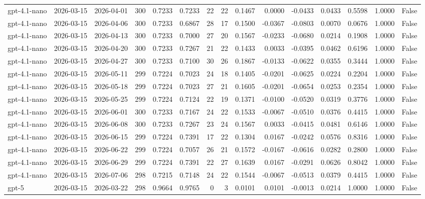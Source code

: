 \begin{table}
\begin{tabular}{lllrrrrrrrrrrrr}
gpt-4.1-nano & 2026-03-15 & 2026-04-01 & 300 & 0.7233 & 0.7233 & 22 & 22 & 0.1467 & 0.0000 & -0.0433 & 0.0433 & 0.5598 & 1.0000 & False \\
gpt-4.1-nano & 2026-03-15 & 2026-04-06 & 300 & 0.7233 & 0.6867 & 28 & 17 & 0.1500 & -0.0367 & -0.0803 & 0.0070 & 0.0676 & 1.0000 & False \\
gpt-4.1-nano & 2026-03-15 & 2026-04-13 & 300 & 0.7233 & 0.7000 & 27 & 20 & 0.1567 & -0.0233 & -0.0680 & 0.0214 & 0.1908 & 1.0000 & False \\
gpt-4.1-nano & 2026-03-15 & 2026-04-20 & 300 & 0.7233 & 0.7267 & 21 & 22 & 0.1433 & 0.0033 & -0.0395 & 0.0462 & 0.6196 & 1.0000 & False \\
gpt-4.1-nano & 2026-03-15 & 2026-04-27 & 300 & 0.7233 & 0.7100 & 30 & 26 & 0.1867 & -0.0133 & -0.0622 & 0.0355 & 0.3444 & 1.0000 & False \\
gpt-4.1-nano & 2026-03-15 & 2026-05-11 & 299 & 0.7224 & 0.7023 & 24 & 18 & 0.1405 & -0.0201 & -0.0625 & 0.0224 & 0.2204 & 1.0000 & False \\
gpt-4.1-nano & 2026-03-15 & 2026-05-18 & 299 & 0.7224 & 0.7023 & 27 & 21 & 0.1605 & -0.0201 & -0.0654 & 0.0253 & 0.2354 & 1.0000 & False \\
gpt-4.1-nano & 2026-03-15 & 2026-05-25 & 299 & 0.7224 & 0.7124 & 22 & 19 & 0.1371 & -0.0100 & -0.0520 & 0.0319 & 0.3776 & 1.0000 & False \\
gpt-4.1-nano & 2026-03-15 & 2026-06-01 & 300 & 0.7233 & 0.7167 & 24 & 22 & 0.1533 & -0.0067 & -0.0510 & 0.0376 & 0.4415 & 1.0000 & False \\
gpt-4.1-nano & 2026-03-15 & 2026-06-08 & 300 & 0.7233 & 0.7267 & 23 & 24 & 0.1567 & 0.0033 & -0.0415 & 0.0481 & 0.6146 & 1.0000 & False \\
gpt-4.1-nano & 2026-03-15 & 2026-06-15 & 299 & 0.7224 & 0.7391 & 17 & 22 & 0.1304 & 0.0167 & -0.0242 & 0.0576 & 0.8316 & 1.0000 & False \\
gpt-4.1-nano & 2026-03-15 & 2026-06-22 & 299 & 0.7224 & 0.7057 & 26 & 21 & 0.1572 & -0.0167 & -0.0616 & 0.0282 & 0.2800 & 1.0000 & False \\
gpt-4.1-nano & 2026-03-15 & 2026-06-29 & 299 & 0.7224 & 0.7391 & 22 & 27 & 0.1639 & 0.0167 & -0.0291 & 0.0626 & 0.8042 & 1.0000 & False \\
gpt-4.1-nano & 2026-03-15 & 2026-07-06 & 298 & 0.7215 & 0.7148 & 24 & 22 & 0.1544 & -0.0067 & -0.0513 & 0.0379 & 0.4415 & 1.0000 & False \\
gpt-5 & 2026-03-15 & 2026-03-22 & 298 & 0.9664 & 0.9765 & 0 & 3 & 0.0101 & 0.0101 & -0.0013 & 0.0214 & 1.0000 & 1.0000 & False \\

\end{tabular}
\end{table}
